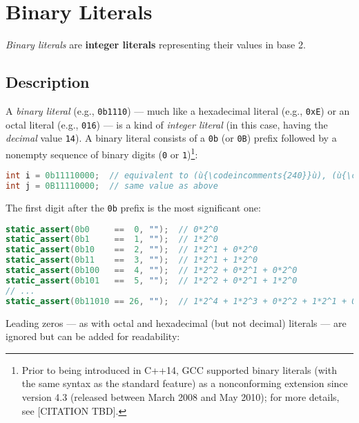 \newpage
\section[Binary Literals]{Binary Literals}\label{binary-literals}


\textit{Binary literals} are \textbf{integer literals} representing their values in base 2.

\subsection[Description]{Description}\label{description}

A \emph{binary literal} (e.g., \texttt{0b1110}) --- much like a
hexadecimal literal (e.g., \texttt{0xE}) or an octal literal (e.g.,
\texttt{016}) --- is a kind of \emph{integer literal} (in this case,
having the \emph{decimal} value \texttt{14}). A binary literal consists
of a \texttt{0b} (or \texttt{0B}) prefix followed by a nonempty
sequence of binary digits (\texttt{0} or \texttt{1}){\cprotect\footnote{Prior to being introduced in C++14, GCC supported binary literals (with the same syntax as the standard feature) as a nonconforming extension since version 4.3 (released between March 2008 and
May 2010); for more details, see [CITATION TBD].}}:

\begin{lstlisting}[language=C++]
int i = 0b11110000;  // equivalent to (ù{\codeincomments{240}}ù), (ù{\codeincomments{0360}}ù), or (ù{\codeincomments{0xF0}}ù)
int j = 0B11110000;  // same value as above
\end{lstlisting}


\noindent The first digit after the \texttt{0b} prefix is the most significant
one:

\begin{lstlisting}[language=C++]
static_assert(0b0     ==  0, "");  // 0*2^0
static_assert(0b1     ==  1, "");  // 1*2^0
static_assert(0b10    ==  2, "");  // 1*2^1 + 0*2^0
static_assert(0b11    ==  3, "");  // 1*2^1 + 1*2^0
static_assert(0b100   ==  4, "");  // 1*2^2 + 0*2^1 + 0*2^0
static_assert(0b101   ==  5, "");  // 1*2^2 + 0*2^1 + 1*2^0
// ...
static_assert(0b11010 == 26, "");  // 1*2^4 + 1*2^3 + 0*2^2 + 1*2^1 + 0*2^0
\end{lstlisting}


\noindent Leading zeros --- as with octal and hexadecimal (but not decimal)
literals --- are ignored but can be added for readability:

